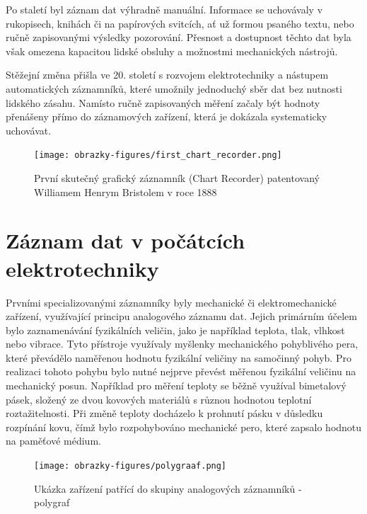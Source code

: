Po staletí byl záznam dat výhradně manuální. Informace se uchovávaly v rukopisech, knihách či na papírových svitcích, ať už formou psaného textu, nebo ručně zapisovanými výsledky pozorování. Přesnost a dostupnost těchto dat byla však omezena kapacitou lidské obsluhy a možnostmi mechanických nástrojů.


Stěžejní změna přišla ve 20. století s rozvojem elektrotechniky a nástupem automatických záznamníků, které umožnily jednoduchý sběr dat bez nutnosti lidského zásahu. Namísto ručně zapisovaných měření začaly být hodnoty přenášeny přímo do záznamových zařízení, která je dokázala systematicky uchovávat. \cite{origin_of_chart_recorders}

\begin{figure}[h] %
    \centering
    \texttt{[image: obrazky-figures/first\_chart\_recorder.png]}
    \caption{První skutečný grafický záznamník (Chart Recorder) patentovaný Williamem Henrym Bristolem v roce 1888 \cite{bristol_chart_recorders}}
    \label{fig:chart_recorder}  
\end{figure}

\section{Záznam dat v počátcích elektrotechniky}
\label{zaznam}
Prvními specializovanými záznamníky byly mechanické či elektromechanické zařízení, využívající principu analogového záznamu dat. Jejich primárním účelem bylo zaznamenávání fyzikálních veličin, jako je například teplota, tlak, vlhkost nebo vibrace. Tyto přístroje využívaly myšlenky mechanického pohyblivého pera, které převádělo naměřenou hodnotu fyzikální veličiny na samočinný pohyb. Pro realizaci tohoto pohybu bylo nutné nejprve převést měřenou fyzikální veličinu na mechanický posun. Například pro měření teploty se běžně využíval bimetalový pásek, složený ze dvou kovových materiálů s různou hodnotou teplotní roztažitelnosti. Při změně teploty docházelo k prohnutí pásku v důsledku rozpínání kovu, čímž bylo rozpohybováno mechanické pero, které zapsalo hodnotu na paměťové médium. 


\begin{figure}[h] %
    \centering
    \texttt{[image: obrazky-figures/polygraaf.png]}
    \caption{Ukázka zařízení patřící do skupiny analogových záznamníků - polygraf \cite{polygraph_picture}}
    \label{fig:polygraaf}
\end{figure}


